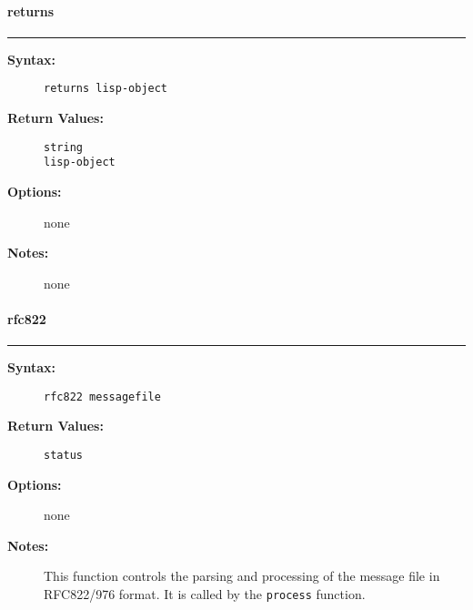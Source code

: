 \vspace {2pt}


\paragraph{returns}

\hrule
\begin{description}
\item[{\bf Syntax:}] \mbox{}

{\tt returns lisp-object}

\item[{\bf Return Values:}] \mbox{}

\begin{description}
\item[{\tt string}] \mbox{}



\item[{\tt lisp-object}] \mbox{}



\end{description}


\item[{\bf Options:}] \mbox{}

none  

\item[{\bf Notes:}] \mbox{}

none

\end{description}


\vspace {2pt}


\paragraph{rfc822}

\hrule
\begin{description}
\item[{\bf Syntax:}] \mbox{}

{\tt rfc822 messagefile}

\item[{\bf Return Values:}] \mbox{}

{\tt status}

\item[{\bf Options:}] \mbox{}

none

\item[{\bf Notes:}] \mbox{}

This function controls the parsing and 
processing of the message file in RFC822/976 format. It is 
called by the {\tt process} function. 

\end{description}


